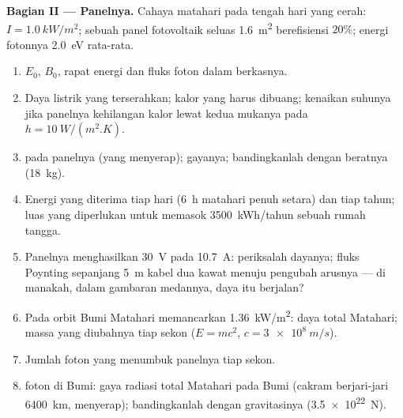 \begin{problem}
\medskip
\noindent\textbf{Bagian II --- Panelnya.}
Cahaya matahari pada tengah hari yang cerah: $I = \qty{1.0}{kW/m^2}$; sebuah panel
fotovoltaik seluas \qty{1.6}{m^2} berefisiensi $20\%$; energi fotonnya \qty{2.0}{eV}
rata-rata.
\begin{enumerate}[resume]
  \item $E_0$, $B_0$, rapat energi dan fluks foton dalam berkasnya.
  \item Daya listrik yang terserahkan; kalor yang harus dibuang; kenaikan
        suhunya jika panelnya kehilangan kalor lewat kedua mukanya pada $h = \qty{10}{W/(m^2.K)}$.
  \item {} pada panelnya (yang menyerap); gayanya; bandingkanlah
        dengan beratnya (\qty{18}{kg}).
  \item Energi yang diterima tiap hari (\qty{6}{h} matahari penuh setara) dan
        tiap tahun; luas yang diperlukan untuk memasok
        \qty{3500}{kWh/tahun} sebuah rumah tangga.
  \item Panelnya menghasilkan \qty{30}{V} pada \qty{10.7}{A}: periksalah dayanya;
        fluks Poynting sepanjang \qty{5}{m} kabel dua kawat menuju
        pengubah arusnya --- di manakah, dalam gambaran medannya, daya itu
        berjalan?
  \item Pada orbit Bumi Matahari memancarkan \qty{1.36}{kW/m^2}: daya
        total Matahari; massa yang diubahnya tiap sekon ($E = mc^2$,
        $c = \qty{3e8}{m/s}$).
  \item Jumlah foton yang menumbuk panelnya tiap sekon.
  \item {} foton di Bumi: gaya radiasi total
        Matahari pada Bumi (cakram berjari-jari \qty{6400}{km}, menyerap);
        bandingkanlah dengan gravitasinya (\qty{3.5e22}{N}).
\end{enumerate}


\end{problem}
